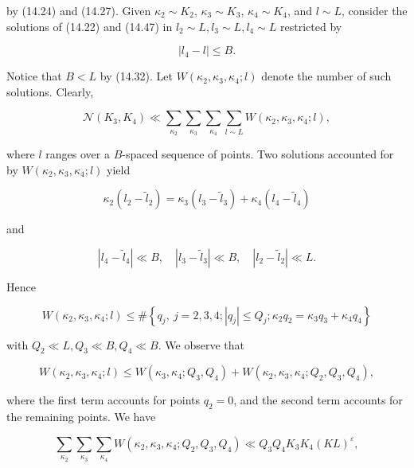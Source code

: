 \documentclass[10pt]{article}
\begin{document}
by (14.24) and (14.27). Given $\kappa_{2}\sim K_{2}$, $\kappa_{3}\sim K_{3}$, $\kappa_{4}\sim K_{4}$, and $l\sim L$, consider the solutions of (14.22) and (14.47) in $l_{2} \sim L, l_{3} \sim L, l_{4} \sim L$ restricted by


\begin{equation*}
\left|l_{4}-l\right| \leqslant B . \tag{14.50}
\end{equation*}


Notice that $B<L$ by (14.32). Let $W\left(\kappa_{2}, \kappa_{3}, \kappa_{4} ; l\right)$ denote the number of such solutions. Clearly,


\begin{equation*}
\mathscr{N}(K_{3},K_{4})\ll \sum_{\kappa_{2}} \sum_{\kappa_{3}} \sum_{\kappa_{4}} \sum_{l \sim L} W\left(\kappa_{2}, \kappa_{3}, \kappa_{4} ; l\right), \tag{14.51}
\end{equation*}


where $l$ ranges over a $B$-spaced sequence of points. Two solutions accounted for by $W\left(\kappa_{2}, \kappa_{3}, \kappa_{4} ; l\right)$ yield

$$
\kappa_{2}\left(l_{2}-\widetilde l_{2}\right)=\kappa_{3}\left(l_{3}-\widetilde l_{3}\right)+\kappa_{4}\left(l_{4}-\widetilde l_{4}\right)
$$

and

$$
\left|l_{4}-\widetilde l_{4}\right|\ll B,\quad\left|l_{3}-\widetilde l_{3}\right|\ll B,\quad\left|l_{2}-\widetilde l_{2}\right|\ll L .
$$

Hence

$$
W\left(\kappa_{2},\kappa_{3},\kappa_{4};l\right) \leqslant \#\left\{q_{j},\ j=2,3,4;\left|q_{j}\right| \leqslant Q_{j} ; \kappa_{2} q_{2}=\kappa_{3} q_{3}+\kappa_{4} q_{4}\right\}
$$

with $Q_{2} \ll L, Q_{3} \ll B, Q_{4}\ll B$. We observe that


\begin{equation*}
W\left(\kappa_{2}, \kappa_{3}, \kappa_{4} ; l\right) \leqslant W\left(\kappa_{3},\kappa_{4};Q_{3},Q_{4}\right)+W\left(\kappa_{2}, \kappa_{3}, \kappa_{4} ; Q_{2}, Q_{3}, Q_{4}\right), \tag{14.52}
\end{equation*}


where the first term accounts for points $q_{2}=0$, and the second term accounts for the remaining points. We have


\begin{equation*}
\sum_{\kappa_{2}} \sum_{\kappa_{3}} \sum_{\kappa_{4}} W\left(\kappa_{2}, \kappa_{3}, \kappa_{4} ; Q_{2}, Q_{3}, Q_{4}\right) \ll Q_{3} Q_{4} K_{3} K_{4}(K L)^{\varepsilon}, \tag{14.53}
\end{equation*}
\end{document}
